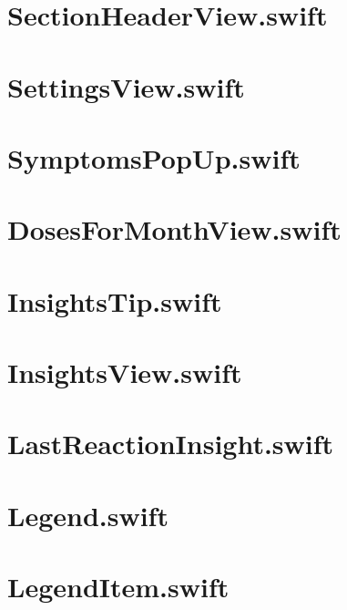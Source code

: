 \section{SectionHeaderView.swift}


\section{SettingsView.swift}


\section{SymptomsPopUp.swift}


\section{DosesForMonthView.swift}


\section{InsightsTip.swift}


\section{InsightsView.swift}


\section{LastReactionInsight.swift}


\section{Legend.swift}


\section{LegendItem.swift}


